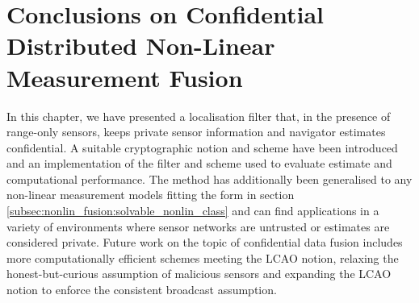 % 
%                                               
%                                               
%                                               
% 

\section{Conclusions on Confidential Distributed Non-Linear Measurement Fusion}\label{sec:nonlin_fusion:conclusion}
In this chapter, we have presented a localisation filter that, in the presence of range-only sensors, keeps private sensor information and navigator estimates confidential. A suitable cryptographic notion and scheme have been introduced and an implementation of the filter and scheme used to evaluate estimate and computational performance. The method has additionally been generalised to any non-linear measurement models fitting the form in section \ref{subsec:nonlin_fusion:solvable_nonlin_class} and can find applications in a variety of environments where sensor networks are untrusted or estimates are considered private. Future work on the topic of confidential data fusion includes more computationally efficient schemes meeting the LCAO notion, relaxing the honest-but-curious assumption of malicious sensors and expanding the LCAO notion to enforce the consistent broadcast assumption.